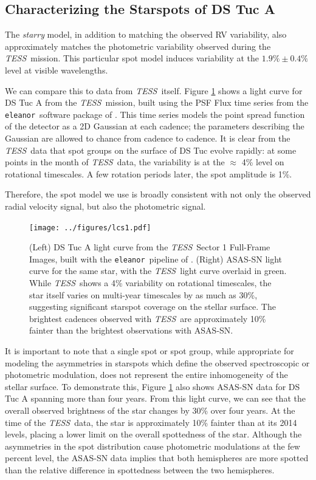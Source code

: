 \documentclass[twocolumn]{aastex63}
\newcommand{\tess}{{\it TESS}}
\newcommand{\eleanor}{\texttt{eleanor}}
\begin{document}
\subsection{Characterizing the Starspots of DS Tuc A}
The \textit{starry} model, in addition to matching the observed RV variability, also approximately matches the photometric variability observed during the \tess\ mission. 
This particular spot model induces variability at the $1.9\% \pm 0.4\%$ level at visible wavelengths.

We can compare this to data from \tess\ itself. 
Figure \ref{fig:lc_data} shows a light curve for DS Tuc A from the \tess\ mission, built using the PSF Flux time series from the \eleanor\ software package of \citet{Feinstein19}. This time series models the point spread function of the detector as a 2D Gaussian at each cadence; the parameters describing the Gaussian are allowed to chance from cadence to cadence. 
It is clear from the \tess\ data that spot groups on the surface of DS Tuc evolve rapidly: at some points in the month of \tess\ data, the variability is at the $\approx$ 4\% level on rotational timescales. 
A few rotation periods later, the spot amplitude is 1\%. 

Therefore, the spot model we use is broadly consistent with not only the observed radial velocity signal, but also the photometric signal.


\begin{figure}[!tbh]
  \begin{center}
    \texttt{[image: ../figures/lcs1.pdf]}
   \end{center}
  \caption{(Left) DS Tuc A light curve from the \tess\ Sector 1 Full-Frame Images, built with the \eleanor\ pipeline of \citet{Feinstein19}. (Right) ASAS-SN light curve for the same star, with the \tess\ light curve overlaid in green. While \tess\ shows a 4\% variability on rotational timescales, the star itself varies on multi-year timescales by as much as 30\%, suggesting significant starspot coverage on the stellar surface. The brightest cadences observed with \tess\ are approximately 10\% fainter than the brightest observations with ASAS-SN.}
  \label{fig:lc_data}
\end{figure}

It is important to note that a single spot or spot group, while appropriate for modeling the asymmetries in starspots which define the observed spectroscopic or photometric modulation, does not represent the entire inhomogeneity of the stellar surface. 
To demonstrate this, Figure \ref{fig:lc_data} also shows ASAS-SN data for DS Tuc A spanning more than four years. 
From this light curve, we can see that the overall observed brightness of the star changes by 30\% over four years. 
At the time of the \tess\ data, the star is approximately 10\% fainter than at its 2014 levels, placing a lower limit on the overall spottedness of the star. 
Although the asymmetries in the spot distribution cause photometric modulations at the few percent level, the ASAS-SN data implies that both hemispheres are more spotted than the relative difference in spottedness between the two hemispheres.
\end{document}
